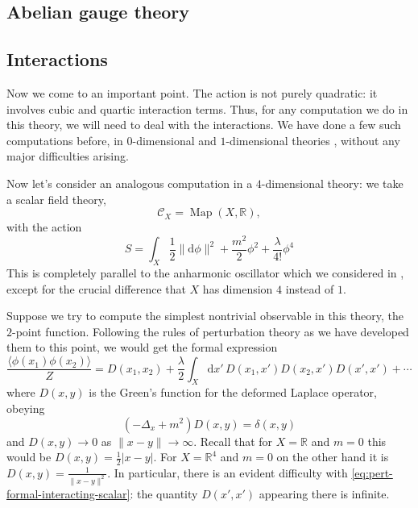 \documentclass[12pt,letterpaper,reqno]{article}
\numberwithin{equation}{section}
\newcommand{\cC}{\ensuremath{\mathcal C}}
\newcommand{\R}{\ensuremath{\mathbb R}}
\newcommand{\half}{\ensuremath{\frac{1}{2}}}
\newcommand{\de}{\mathrm{d}}
\newcommand{\abs}[1]{\lvert#1\rvert}
\newcommand{\norm}[1]{\lVert#1\rVert}
\newcommand{\IP}[1]{\langle#1\rangle}
\DeclareMathOperator{\Map}{Map}
\newcommand{\fixme}[1]{{\color{orange}{[#1]}}}
\begin{document}
\subsection{Abelian gauge theory}

\fixme{abelian gauge theory}

\fixme{summing over bundles}

\fixme{electric/magnetic duality}

\fixme{exercise: modular property of partition function on a Riemannian manifold, ref Witten}

\fixme{coupling to background currents: Wilson line}

\fixme{coupling to dynamical currents}

\fixme{nonperturbative sectors}

\subsection{Interactions}

Now we come to an important point. The action \fixme{...} is not 
purely quadratic: it involves cubic and quartic interaction terms.
Thus, for any computation we do in this theory, we will need to
deal with the interactions.
We have done a few such computations before, in $0$-dimensional
and $1$-dimensional theories \fixme{...}, without any major difficulties arising.

Now let's consider an analogous computation in a $4$-dimensional theory:
we take a scalar field theory,
\begin{equation}
  \cC_X = \Map(X, \R),
\end{equation}
with the action
\begin{equation}
  S = \int_X \half \norm{\de \phi}^2 + \frac{m^2}{2} \phi^2 + \frac{\lambda}{4!} \phi^4
\end{equation}
This is completely 
parallel to the anharmonic oscillator which we considered in \fixme{...},
except for the crucial difference that $X$ has dimension $4$
instead of $1$.

Suppose we try to compute the simplest nontrivial observable in this theory,
the $2$-point function. Following the rules of perturbation theory as we have developed
them to this point, we would get the formal expression
\begin{equation} \label{eq:pert-formal-interacting-scalar}
  \frac{\IP{\phi(x_1) \phi(x_2)}}{Z} = D(x_1, x_2) + \frac{\lambda}{2} \int_{X} \de x' \, D(x_1,x') D(x_2,x') D(x',x') + \cdots
\end{equation}
where $D(x,y)$ is the Green's function for the deformed Laplace operator, obeying
\begin{equation}
  (-\Delta_{x} + m^2) D(x, y) = \delta(x, y)
\end{equation}
and $D(x,y) \to 0$ as $\norm{x-y} \to \infty$.
Recall \fixme{...} that for $X = \R$ and $m=0$ this would be $D(x,y) = \half \abs{x-y}$.
For $X = \R^4$ and $m=0$ on the other hand it is $D(x,y) = \frac{1}{\norm{x-y}^2}$. \fixme{constant?}
In particular, there is an evident difficulty with \eqref{eq:pert-formal-interacting-scalar}:
the quantity $D(x',x')$ appearing there is infinite.
\end{document}
